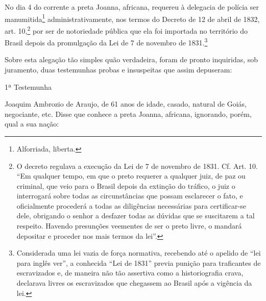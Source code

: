 No dia 4 do corrente a preta Joanna, africana, requereu à delegacia de
polícia ser manumitida\footnote{ Alforriada, liberta.}
administrativamente, nos termos do Decreto de 12 de abril de 1832, art.
10,\footnote{ O decreto regulava a execução da Lei de 7 de novembro de
  1831. Cf. Art. 10. ``Em qualquer tempo, em que o preto requerer a
  qualquer juiz, de paz ou criminal, que veio para o Brasil depois da
  extinção do tráfico, o juiz o interrogará sobre todas as
  circunstâncias que possam esclarecer o fato, e oficialmente procederá
  a todas as diligências necessárias para certificar-se dele, obrigando
  o senhor a desfazer todas as dúvidas que se suscitarem a tal respeito.
  Havendo presunções veementes de ser o preto livre, o mandará depositar
  e proceder nos mais termos da lei''.} por ser de notoriedade pública
que ela foi importada no território do Brasil depois da promulgação da
Lei de 7 de novembro de 1831.\footnote{ Considerada uma lei vazia de
  força normativa, recebendo até o apelido de ``lei para inglês ver'', a
  conhecida ``Lei de 1831'' previa punição para traficantes de
  escravizados e, de maneira não tão assertiva como a historiografia
  crava, declarava livres os escravizados que chegassem ao Brasil após a
  vigência da lei.}

Sobre esta alegação tão simples quão verdadeira, foram de pronto
inquiridas, sob juramento, duas testemunhas probas e insuspeitas que
assim depuseram:

1ª Testemunha

Joaquim Ambrozio de Araujo, de 61 anos de idade, casado, natural de
Goiás, negociante, etc. Disse que conhece a preta Joanna, africana,
ignorando, porém, qual a sua nação:

